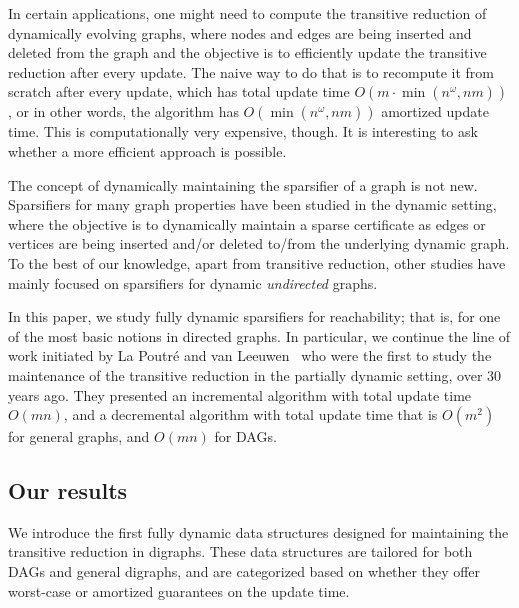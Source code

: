 \documentclass[11pt]{article}
\begin{document}
In certain applications, one might need to compute the transitive reduction of dynamically evolving graphs, where nodes and edges are being inserted and deleted from the graph and the objective is to efficiently update the transitive reduction after every update. 
 The naive way to do that is to recompute it from scratch after every update, which has total update time $O\left(m \cdot \min(n^\omega,nm)\right)$, or in other words, the algorithm has $O\left(\min(n^\omega,nm)\right)$ amortized update time.
 This is computationally very expensive, though.
 It is interesting to ask whether a more efficient approach is possible.

The concept of dynamically maintaining the sparsifier of a graph is not new.
Sparsifiers for many graph properties have been studied in the dynamic setting, where the objective is to dynamically maintain a sparse certificate as edges or vertices are being inserted and/or deleted to/from the underlying dynamic graph. To the best of our knowledge, apart from transitive reduction, other studies have mainly focused on sparsifiers for dynamic \emph{undirected} graphs. 



In this paper, we study fully dynamic sparsifiers for reachability; that is, for one of the most basic notions in directed graphs. 
In particular, we continue the line of work initiated by La Poutr{\'e} and van Leeuwen~\cite{lapoutre1988} who were the first to study the maintenance of the transitive reduction in the partially dynamic setting, over 30 years ago. They presented an incremental algorithm with total update time $O(mn)$, and a decremental algorithm with total update time that is $O(m^2)$ for general graphs, and $O(mn)$ for DAGs.


\subsection{Our results}
We introduce the first fully dynamic data structures designed for maintaining the transitive reduction in digraphs. These data structures are tailored for both DAGs and general digraphs, and are categorized based on whether they offer worst-case or amortized guarantees on the update time.
\end{document}
